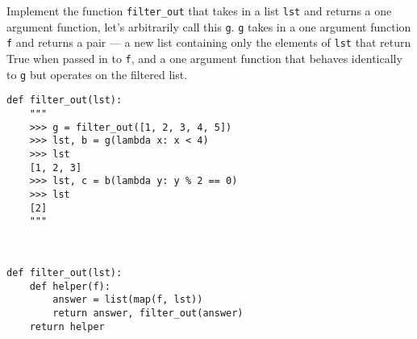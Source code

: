 \begin{blocksection}
\question Implement the function \lstinline$filter_out$ that takes in a list \lstinline$lst$ and returns a one argument function, let’s arbitrarily call this \lstinline$g$. \lstinline$g$ takes in a one argument function \lstinline$f$  and returns a pair — a new list containing only the elements of \lstinline$lst$ that return True when passed in to \lstinline$f$, and a one argument function that behaves identically to \lstinline$g$ but operates on the filtered list.

\begin{lstlisting}
def filter_out(lst):
    """
    >>> g = filter_out([1, 2, 3, 4, 5])
    >>> lst, b = g(lambda x: x < 4)
    >>> lst
    [1, 2, 3]
    >>> lst, c = b(lambda y: y % 2 == 0)
    >>> lst
    [2]
    """

    
\end{lstlisting}

\begin{solution}[1.5in]
\begin{lstlisting}
def filter_out(lst):
    def helper(f):
        answer = list(map(f, lst))
        return answer, filter_out(answer)
    return helper
\end{lstlisting}
\end{solution}
\end{blocksection}
